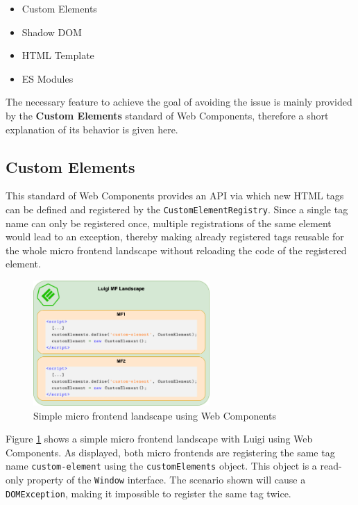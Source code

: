 \begin{itemize}[noitemsep]
	\item Custom Elements
	\item Shadow DOM
	\item HTML Template
	\item ES Modules
\end{itemize}


The necessary feature to achieve the goal of avoiding the issue is mainly provided by the \textbf{Custom Elements} standard of Web Components, therefore a short explanation of its behavior is given here.

\subsection{Custom Elements}

This standard of Web Components provides an API via which new HTML tags can be defined and registered by the \texttt{CustomElementRegistry}. Since a single tag name can only be registered once, multiple registrations of the same element would lead to an exception, thereby making already registered tags reusable for the whole micro frontend landscape without reloading the code of the registered element.\cite{google_reusable_wcs}

\begin{figure}[!h]
	\centering
	\includegraphics[width=0.6\textwidth]{Figures/customElements_registered.drawio.png}
	\caption{Simple micro frontend landscape using Web Components}
	\label{fig:same_wc_example}
\end{figure}

Figure \ref{fig:same_wc_example} shows a simple micro frontend landscape with Luigi using Web Components. As displayed, both micro frontends are registering the same tag name \texttt{custom-element} using the \texttt{customElements} object. This object is a read-only property of the \texttt{Window} interface.
The scenario shown will cause a  \texttt{DOMException}, making it impossible to register the same tag twice.

